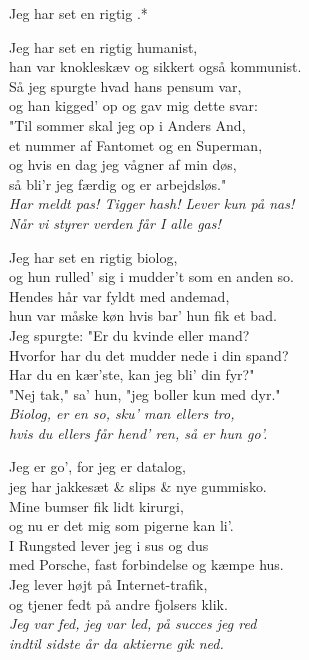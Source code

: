\begin{song}{Jeg har set en rigtig .*}
  \begin{SBVerse}
    Jeg har set en rigtig humanist,\\
    han var knokleskæv og sikkert også kommunist.\\
    Så jeg spurgte hvad hans pensum var,\\
    og han kigged’ op og gav mig dette svar:\\\medskip
    "Til sommer skal jeg op i Anders And,\\
    et nummer af Fantomet og en Superman,\\
    og hvis en dag jeg vågner af min døs,\\
    så bli’r jeg færdig og er arbejdsløs."\\\medskip
    \emph{Har meldt pas! Tigger hash! Lever kun på nas!\\
    Når vi styrer verden får I alle gas!}
  \end{SBVerse}

  \begin{SBVerse}
    Jeg har set en rigtig biolog,\\
    og hun rulled’ sig i mudder’t som en anden so.\\
    Hendes hår var fyldt med andemad,\\
    hun var måske køn hvis bar’ hun fik et bad.\\\medskip
    Jeg spurgte: "Er du kvinde eller mand?\\
    Hvorfor har du det mudder nede i din spand?\\
    Har du en kær’ste, kan jeg bli’ din fyr?"\\
    "Nej tak," sa’ hun, "jeg boller kun med dyr."\\\medskip
    \emph{Biolog, er en so, sku’ man ellers tro,\\
    hvis du ellers får hend’ ren, så er hun go’.}
  \end{SBVerse}

  \begin{SBVerse}
    Jeg er go’, for jeg er datalog,\\
    jeg har jakkesæt \& slips \& nye gummisko.\\
    Mine bumser fik lidt kirurgi,\\
    og nu er det mig som pigerne kan li’.\\\medskip
    I Rungsted lever jeg i sus og dus\\
    med Porsche, fast forbindelse og kæmpe hus.\\
    Jeg lever højt på Internet-trafik,\\
    og tjener fedt på andre fjolsers klik.\\\medskip
    \emph{Jeg var fed, jeg var led, på succes jeg red\\
    indtil sidste år da aktierne gik ned.}
  \end{SBVerse}
\end{song}